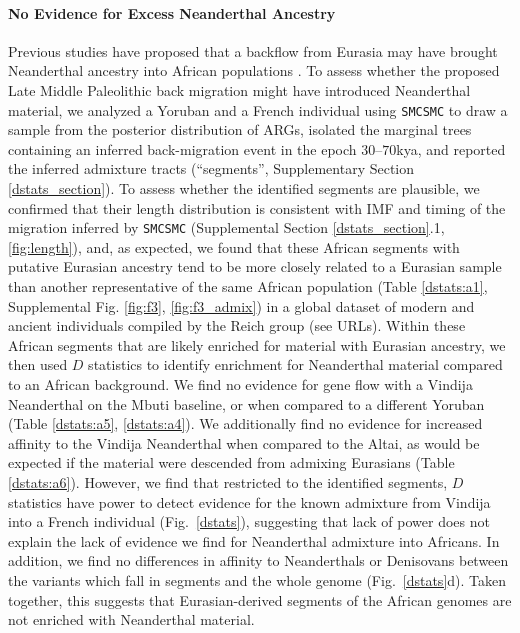 \paragraph{No Evidence for Excess Neanderthal Ancestry} Previous studies have proposed that a backflow from Eurasia may have brought Neanderthal ancestry into African populations \cite{Chen2020}. To assess whether the proposed Late Middle Paleolithic back migration might have introduced Neanderthal material, we analyzed a Yoruban and a French individual using {\tt SMCSMC} to draw a sample from the posterior distribution of ARGs, isolated the marginal trees containing an inferred back-migration event in the epoch $30$--$70$kya, and reported the inferred admixture tracts (``segments'', Supplementary Section \ref{dstats_section}). To assess whether the identified segments are plausible, we confirmed that their length distribution is consistent with IMF and timing of the migration inferred by {\tt SMCSMC} (Supplemental Section \ref{dstats_section}.1, \ref{fig:length}), and, as expected, we found that these African segments with putative Eurasian ancestry tend to be more closely related to a Eurasian sample than another representative of the same African population (Table \ref{dstats:a1}, Supplemental Fig. \ref{fig:f3}, \ref{fig:f3_admix}) in a global dataset of modern and ancient individuals compiled by the Reich group (see URLs). Within these African segments that are likely enriched for material with Eurasian ancestry, we then used $D$ statistics \cite{Patterson2012} to identify enrichment for Neanderthal material compared to an African background. We find no evidence for gene flow with a Vindija Neanderthal on the Mbuti baseline, or when compared to a different Yoruban (Table \ref{dstats:a5}, \ref{dstats:a4}). We additionally find no evidence for increased affinity to the Vindija Neanderthal when compared to the Altai, as would be expected if the material were descended from admixing Eurasians (Table \ref{dstats:a6}). However, we find that restricted to the identified segments, $D$ statistics have power to detect evidence for the known admixture from Vindija into a French individual (Fig.\ \ref{dstats}), suggesting that lack of power does not explain the lack of evidence we find for Neanderthal admixture into Africans.  In addition, we find no differences in affinity to Neanderthals or Denisovans between the variants which fall in segments and the whole genome (Fig.\ \ref{dstats}d). Taken together, this suggests that Eurasian-derived segments of the African genomes are not enriched with Neanderthal material.

